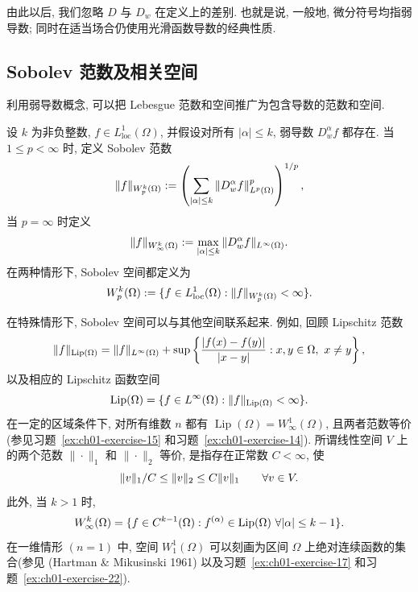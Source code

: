 由此以后, 我们忽略 $D$ 与 $D_w$ 在定义上的差别. 也就是说, 一般地, 微分符号均指弱导数; 同时在适当场合仍使用光滑函数导数的经典性质.

\subsection{Sobolev 范数及相关空间}
\label{sec:ch01-sobolev-norms}

利用弱导数概念, 可以把 Lebesgue 范数和空间推广为包含导数的范数和空间.

\setcounter{thmcount}{0}
\begin{Definition}
\label{def:ch01-sobolev-norm-space}
设 $k$ 为非负整数, $f\in L_{\mathrm{loc}}^1(\Omega)$, 并假设对所有 $|\alpha|\leq k$, 弱导数 $D_w^\alpha f$ 都存在. 当 $1\leq p<\infty$ 时, 定义 Sobolev 范数
\[
\MathBookFormulaID{formula-ch01-sobolev-norm-finite-p}
\|f\|_{W_p^k(\Omega)}:=
\left(\sum_{|\alpha|\leq k}\|D_w^\alpha f\|_{L^p(\Omega)}^p\right)^{1/p},
\]
当 $p=\infty$ 时定义
\[
\MathBookFormulaID{formula-ch01-sobolev-norm-infinity}
\|f\|_{W_\infty^k(\Omega)}:=
\max_{|\alpha|\leq k}\|D_w^\alpha f\|_{L^\infty(\Omega)}.
\]
在两种情形下, Sobolev 空间都定义为
\[
\MathBookFormulaID{formula-ch01-sobolev-space}
W_p^k(\Omega):=\{f\in L_{\mathrm{loc}}^1(\Omega):
\|f\|_{W_p^k(\Omega)}<\infty\}.
\]
\end{Definition}

在特殊情形下, Sobolev 空间可以与其他空间联系起来. 例如, 回顾 Lipschitz 范数
\[
\MathBookFormulaID{formula-ch01-lipschitz-norm}
\|f\|_{\operatorname{Lip}(\Omega)}=
\|f\|_{L^\infty(\Omega)}+
\sup\left\{\frac{|f(x)-f(y)|}{|x-y|}:x,y\in\Omega,\ x\neq y\right\},
\]
以及相应的 Lipschitz 函数空间
\[
\MathBookFormulaID{formula-ch01-lipschitz-space}
\operatorname{Lip}(\Omega)=
\{f\in L^\infty(\Omega):\|f\|_{\operatorname{Lip}(\Omega)}<\infty\}.
\]
在一定的区域条件下, 对所有维数 $n$ 都有 $\operatorname{Lip}(\Omega)=W_\infty^1(\Omega)$, 且两者范数等价(参见习题~\ref{ex:ch01-exercise-15} 和习题~\ref{ex:ch01-exercise-14}). 所谓线性空间 $V$ 上的两个范数 $\|\cdot\|_1$ 和 $\|\cdot\|_2$ 等价, 是指存在正常数 $C<\infty$, 使
\[
\MathBookFormulaID{formula-ch01-equivalent-norms}
\|v\|_1/C\leq\|v\|_2\leq C\|v\|_1
\qquad\forall v\in V.
\]
此外, 当 $k>1$ 时,
\[
\MathBookFormulaID{formula-ch01-winfinity-characterization}
W_\infty^k(\Omega)=
\{f\in C^{k-1}(\Omega):f^{(\alpha)}\in\operatorname{Lip}(\Omega)
\ \forall|\alpha|\leq k-1\}.
\]
在一维情形 $(n=1)$ 中, 空间 $W_1^1(\Omega)$ 可以刻画为区间 $\Omega$ 上绝对连续函数的集合(参见 (Hartman \& Mikusinski 1961) 以及习题~\ref{ex:ch01-exercise-17} 和习题~\ref{ex:ch01-exercise-22}).

